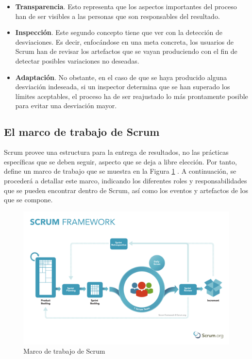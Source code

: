 \begin{itemize}
    \item \textbf{Transparencia}. Esto representa que los aspectos importantes del proceso han de ser visibles a las personas que son responsables del resultado.
    \item \textbf{Inspección}. Este segundo concepto tiene que ver con la detección de desviaciones. Es decir, enfocándose en una meta concreta, los usuarios de Scrum han de revisar los artefactos que se vayan produciendo con el fin de detectar posibles variaciones no deseadas.
    \item \textbf{Adaptación}. No obstante, en el caso de que se haya producido alguna desviación indeseada, si un inspector determina que se han superado los límites aceptables, el proceso ha de ser reajustado lo más prontamente posible para evitar una desviación mayor.
\end{itemize}

\subsection{El marco de trabajo de Scrum}
Scrum provee una estructura para la entrega de resultados, no las prácticas específicas que se deben seguir, aspecto que se deja a libre elección. Por tanto, define un marco de trabajo que se muestra en la Figura \ref{fig:scrum_framework} \cite{scrumframewok}. A continuación, se procederá a detallar este marco, indicando los diferentes roles y responsabilidades que se pueden encontrar dentro de Scrum, así como los eventos y artefactos de los que se compone.

\begin{figure}[h]
  \centering
  \includegraphics[width=0.8\linewidth]{figures/images/ScrumFramework.pdf}
  \caption{Marco de trabajo de Scrum}
  \label{fig:scrum_framework}
\end{figure}

